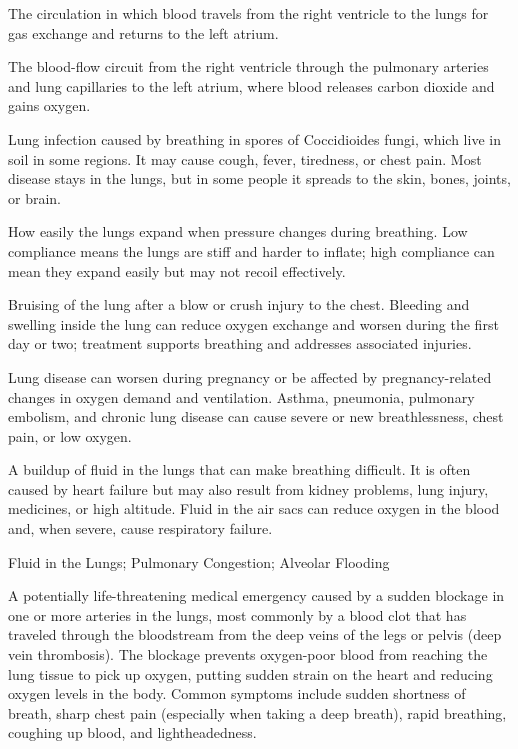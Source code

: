  The circulation in which blood travels from the right ventricle to the lungs for gas exchange and returns to the left atrium.

 The blood-flow circuit from the right ventricle through the pulmonary arteries and lung capillaries to the left atrium, where blood releases carbon dioxide and gains oxygen.

 Lung infection caused by breathing in spores
of Coccidioides fungi, which live in soil in some regions. It may cause cough, fever,
tiredness, or chest pain. Most disease stays in the lungs, but in some people it
spreads to the skin, bones, joints, or brain.

 How easily the lungs expand when pressure changes during breathing. Low compliance means the lungs are stiff and harder to inflate; high compliance can mean they expand easily but may not recoil effectively.

 Bruising of the lung after a blow or crush injury to the chest. Bleeding and swelling inside the lung can reduce oxygen exchange and worsen during the first day or two; treatment supports breathing and addresses associated injuries.

 Lung disease can worsen during pregnancy or be affected by pregnancy-related changes in oxygen demand and ventilation. Asthma, pneumonia, pulmonary embolism, and chronic lung disease can cause severe or new breathlessness, chest pain, or low oxygen.

 A buildup of fluid in the lungs that can make breathing
difficult. It is often caused by heart failure but may also result from kidney
problems, lung injury, medicines, or high altitude. Fluid in the air sacs can reduce
oxygen in the blood and, when severe, cause respiratory failure.


\synonyms
Fluid in the Lungs; Pulmonary Congestion; Alveolar Flooding

 A potentially life-threatening medical emergency caused by a sudden blockage in one or more arteries in the lungs, most commonly by a blood clot that has traveled through the bloodstream from the deep veins of the legs or pelvis (deep vein thrombosis). The blockage prevents oxygen-poor blood from reaching the lung tissue to pick up oxygen, putting sudden strain on the heart and reducing oxygen levels in the body. Common symptoms include sudden shortness of breath, sharp chest pain (especially when taking a deep breath), rapid breathing, coughing up blood, and lightheadedness.

